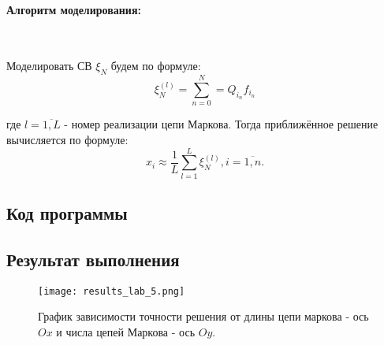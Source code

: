 \paragraph{Алгоритм моделирования:}\
\

Моделировать СВ $\xi_{N}$ будем по формуле:
\begin{equation}
	\xi_{N}^{(l)}=\sum\limits_{n=0}^{N}=Q_{i_{n}}f_{i_{n}}
\end{equation}

где $l=\overline{1,L}$ - номер реализации цепи Маркова. Тогда приближённое решение вычисляется по формуле:
\begin{equation}
	x_{i} \approx \frac{1}{L}\sum\limits_{l=1}^{L}\xi_{N}^{(l)}, i = \overline{1,n}.
\end{equation}

\subsection{Код программы}



\subsection{Результат выполнения}

\begin{figure}[H]
	\texttt{[image: results\_lab\_5.png]}
	\label{fig:results_lab_5}
	\caption{График зависимости точности решения от длины цепи маркова - ось $Ox$ и числа цепей Маркова - ось $Oy$.}
\end{figure}
